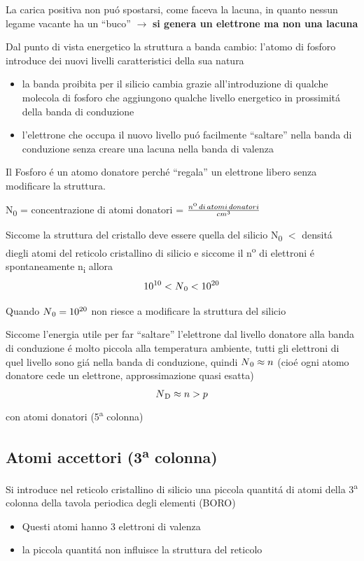 \documentclass{article}
\begin{document}
La carica positiva non pu\'o spostarsi, come faceva la lacuna, in quanto nessun legame vacante ha un ``buco'' $\rightarrow$ \textbf{si genera un elettrone ma non una lacuna}

Dal punto di vista energetico la struttura a banda cambio:
l'atomo di fosforo introduce dei nuovi livelli caratteristici della sua natura
\begin{itemize}
    \item la banda proibita per il silicio cambia grazie all'introduzione di qualche molecola di fosforo che aggiungono qualche livello energetico in prossimit\'a della banda di conduzione
    \item l'elettrone che occupa il nuovo livello pu\'o facilmente ``saltare'' nella banda di conduzione senza creare una lacuna nella banda di valenza

\end{itemize}

Il Fosforo \'e un atomo donatore perch\'e ``regala'' un elettrone libero senza modificare la struttura.

N\textsubscript{0} = concentrazione di atomi donatori = $\frac{n\textsuperscript{o}\,di\,atomi\, donatori}{cm^3}$

Siccome la struttura del cristallo deve essere quella del silicio N\textsubscript{0} $<$ densit\'a diegli atomi del reticolo cristallino di silicio e siccome il n\textsuperscript{o} di elettroni \'e spontaneamente n\textsubscript{i} allora
\[
    10^{10} < N\textsubscript{0} < 10^{20}
\]

Quando $N\textsubscript{0}=10^{20}$ non riesce a modificare la struttura del silicio

Siccome l'energia utile per far ``saltare'' l'elettrone dal livello donatore alla banda di conduzione \'e molto piccola alla temperatura ambiente, tutti gli elettroni di quel livello sono gi\'a nella banda di conduzione, quindi $N\textsubscript{0} \approx n$  (cio\'e ogni atomo donatore cede un elettrone, approssimazione quasi esatta)
\[
    N\textsubscript{D} \approx n > p
\] con atomi donatori (5\textsuperscript{a} colonna)

\subsection{Atomi accettori (3\textsuperscript{a} colonna)}
Si introduce nel reticolo cristallino di silicio una piccola quantit\'a di atomi della 3\textsuperscript{a} colonna della tavola periodica degli elementi (BORO)
\begin{itemize}
    \item Questi atomi hanno 3 elettroni di valenza
    \item la piccola quantit\'a non influisce la struttura del reticolo
\end{itemize}
\end{document}
